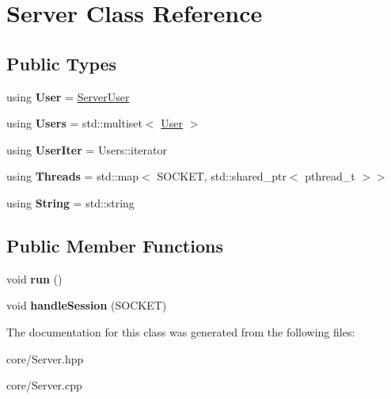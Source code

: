 \hypertarget{classServer}{}\section{Server Class Reference}
\label{classServer}
\subsection*{Public Types}
\begin{DoxyCompactItemize}
\item 
using {\bfseries User} = \hyperlink{classServerUser}{Server\+User}\hypertarget{classServer_ae199c8a54f7743b0181ea5f48e50a69d}{}\label{classServer_ae199c8a54f7743b0181ea5f48e50a69d}

\item 
using {\bfseries Users} = std\+::multiset$<$ \hyperlink{classServerUser}{User} $>$\hypertarget{classServer_ab902a3e46b2e21d12d98abf605938220}{}\label{classServer_ab902a3e46b2e21d12d98abf605938220}

\item 
using {\bfseries User\+Iter} = Users\+::iterator\hypertarget{classServer_acef110486eb4a71d00b83283515779f1}{}\label{classServer_acef110486eb4a71d00b83283515779f1}

\item 
using {\bfseries Threads} = std\+::map$<$ S\+O\+C\+K\+ET, std\+::shared\+\_\+ptr$<$ pthread\+\_\+t $>$$>$\hypertarget{classServer_afdd32289149452b116ce1483d4fe18e6}{}\label{classServer_afdd32289149452b116ce1483d4fe18e6}

\item 
using {\bfseries String} = std\+::string\hypertarget{classServer_adb2fd27b9be87e7ba0206002a03e5998}{}\label{classServer_adb2fd27b9be87e7ba0206002a03e5998}

\end{DoxyCompactItemize}
\subsection*{Public Member Functions}
\begin{DoxyCompactItemize}
\item 
void {\bfseries run} ()\hypertarget{classServer_abb27d30b40a94326e3fd629d3b30b7d5}{}\label{classServer_abb27d30b40a94326e3fd629d3b30b7d5}

\item 
void {\bfseries handle\+Session} (S\+O\+C\+K\+ET)\hypertarget{classServer_a730cf1aeb7f2f7f173fb6e64164b7d05}{}\label{classServer_a730cf1aeb7f2f7f173fb6e64164b7d05}

\end{DoxyCompactItemize}


The documentation for this class was generated from the following files\+:\begin{DoxyCompactItemize}
\item 
core/Server.\+hpp\item 
core/Server.\+cpp\end{DoxyCompactItemize}
